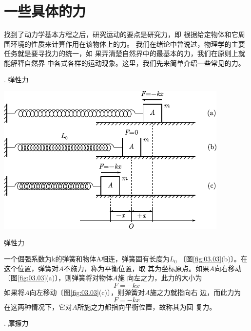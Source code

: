 \section{一些具体的力}\label{sec:03.04}

找到了动力学基本方程之后，研究运动的要点是研究力，即
根据给定物体和它周围环境的性质来计算作用在该物体上的力。
我们在绪论中曾说过，物理学的主要任务就是要寻找力的统一，如
果弄清楚自然界中的最基本的力，我们在原则上就能解释自然界
中各式各样的运动现象。这里，我们先来简单介绍一些常见的力。

. 弹性力 \normalfont
\begin{figurex}[!h]
    \centering
    \includegraphics{figure/fig03.03}
    \caption{弹性力}
    \label{fig:03.03}
\end{figurex}

一个倔强系数为k的弹簧和物体A相连，弹簧固有长度为$ L _ { 0 } $
〔图\ref{fig:03.03}(b)〕。在这个位置，弹簧对$ A $不施力，称为平衡位置，取
其为坐标原点。如果$ A $向右移动〔图\ref{fig:03.03}(a)〕，则弹簧将对物体$ A $施
向左之力，此力的大小为
\begin{equation}\label{eqn:03.04.01}
    F = - k x
\end{equation}
如果将$ A $向左移动〔图\ref{fig:03.03}(c)〕，则弹簧对$ A $施之力就指向右
边，而此力为
\begin{equation*}
    F = - k x
\end{equation*}
在这两种情况下，它对$ A $所施之力都指向平衡位置，故称其为回
复力。

. 摩擦力 \normalfont

